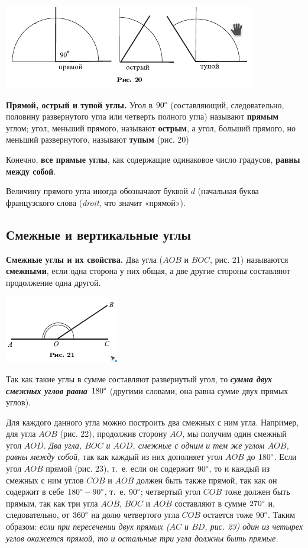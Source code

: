 \documentclass[oneside]{book}
\begin{document}
\includegraphics{pics/ris-20}

\textbf{Прямой, острый и тупой углы.}
Угол в $90\degree$ (составляющий, следовательно, половину развернутого угла или четверть полного угла) называют \textbf{прямым} углом;
угол, меньший прямого, называют \textbf{острым}, а угол, больший прямого, но меньший развернутого, называют \textbf{тупым} (рис. 20)

Конечно, \textbf{все прямые углы}, как содержащие одинаковое число градусов, \textbf{равны между собой}.

Величину прямого угла иногда обозначают буквой $d$ (начальная буква французского слова (\emph{droit}, что значит «прямой»).

\subsection*{Смежные и вертикальные углы}


\textbf{Смежные углы и их свойства.}
Два угла ($AOB$ и $BOC$, рис. 21) называются \textbf{смежными}, если одна сторона у них общая, а две другие стороны составляют продолжение одна другой.

\includegraphics{pics/ris-21}

Так как такие углы в сумме составляют развернутый угол, то \textbf{\emph{сумма двух смежных углов равна $180\degree$}} (другими словами, она равна сумме двух прямых углов).

Для каждого данного угла можно построить два смежных с ним угла.
Например, для угла $AOB$ (рис. 22), продолжив сторону $AO$, мы получим один смежный угол $AOD$.
\emph{Два угла, $BOC$ и $AOD$, смежные с одним и тем же углом $AOB$, равны между собой,} так как каждый из них дополняет угол $AOB$ до $180\degree$.
Если угол $AOB$ прямой (рис. 23), т.~е. если он содержит $90\degree$, то и каждый из смежных с ним углов $COB$ и $AOB$ должен быть также прямой, так как он содержит в себе $180\degree-90\degree$, т.~е. $90\degree$;
четвертый угол $COB$ тоже должен быть прямым, так как три угла $AOB$, $BOC$ и $AOB$ составляют в сумме $270\degree$ и, следовательно, от $360\degree$ на долю четвертого угла $COB$ остается тоже $90\degree$.
Таким образом:
\emph{если при пересечении двух прямых \emph{($AC$ и $BD$, рис. 23)} один из четырех углов окажется прямой, то и остальные три угла должны быть прямые.}
\end{document}
